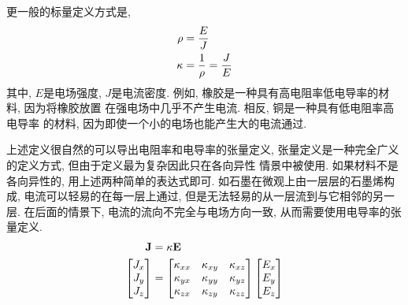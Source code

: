 \documentclass[a4paper]{article}
\begin{document}
\par
更一般的标量定义方式是,
\begin{equation}
	\centering
	\begin{aligned}
		\rho &= \frac{E}{J}\\
		\kappa &= \frac{1}{\rho} = \frac{J}{E}\\
	\end{aligned}
\end{equation}
其中, $E$是电场强度, $J$是电流密度. 例如, 
橡胶是一种具有高电阻率低电导率的材料, 因为将橡胶放置
在强电场中几乎不产生电流. 相反, 铜是一种具有低电阻率高电导率
的材料, 因为即使一个小的电场也能产生大的电流通过.
\par
上述定义很自然的可以导出电阻率和电导率的张量定义, 
张量定义是一种完全广义的定义方式, 但由于定义最为复杂因此只在各向异性
情景中被使用. 如果材料不是各向异性的, 用上述两种简单的表达式即可. 
如石墨在微观上由一层层的石墨烯构成, 电流可以轻易的在每一层上通过, 
但是无法轻易的从一层流到与它相邻的另一层. 在后面的情景下, 
电流的流向不完全与电场方向一致, 从而需要使用电导率的张量定义.
\begin{equation}
	\centering
	\begin{aligned}
		\mathbf{J} &= \mathbf{\kappa} \mathbf{E}\\
		\left[\begin{matrix}
			J_{x}\\
			J_{y}\\
			J_{z}\\ 
	  \end{matrix}\right]
	  &=
		\left[\begin{matrix}
			\kappa_{xx} & \kappa_{xy} & \kappa_{xz} \\
			\kappa_{yx} & \kappa_{yy} & \kappa_{yz} \\
			\kappa_{zx} & \kappa_{zy} & \kappa_{zz} 
		\end{matrix}\right] 
		\left[\begin{matrix}
			  E_{x}\\
			  E_{y}\\
			  E_{z}\\ 
		\end{matrix}\right]
	\end{aligned}
\end{equation}
\end{document}
